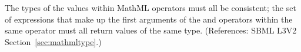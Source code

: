 The types of the values within MathML  operators must all
be consistent; \ie the set of expressions that make up the first
arguments of the  and  operators within the
same  operator must all return values of the same type.
(References: SBML L3V2 Section~\ref{sec:mathmltype}.)
